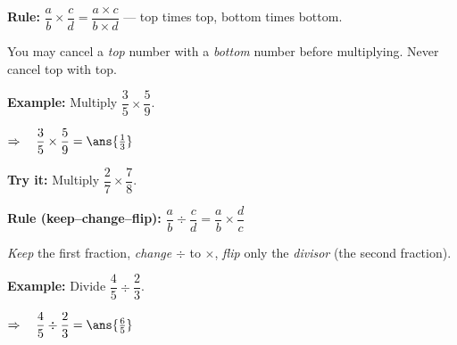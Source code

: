 \documentclass[12pt]{article}
\begin{document}


\begin{formulabox}
\textbf{Rule:} \quad
$\dfrac{a}{b} \times \dfrac{c}{d} = \dfrac{a \times c}{b \times d}$
\quad --- top times top, bottom times bottom.\par
You may cancel a \emph{top} number with a \emph{bottom} number before
multiplying. Never cancel top with top.
\end{formulabox}

\begin{examplebox}
\textbf{Example:} \quad Multiply $\dfrac{3}{5} \times \dfrac{5}{9}$.

$\Rightarrow\quad \dfrac{3}{5} \times \dfrac{5}{9} = \ans{\tfrac{1}{3}}$
\end{examplebox}

\begin{tryitbox}
\textbf{Try it:} \quad Multiply $\dfrac{2}{7} \times \dfrac{7}{8}$.\\[2pt]
\end{tryitbox}


\begin{formulabox}
\textbf{Rule (keep--change--flip):} \quad
$\dfrac{a}{b} \div \dfrac{c}{d} = \dfrac{a}{b} \times \dfrac{d}{c}$\par
\emph{Keep} the first fraction, \emph{change} $\div$ to $\times$, \emph{flip}
only the \emph{divisor} (the second fraction).
\end{formulabox}

\begin{examplebox}
\textbf{Example:} \quad Divide $\dfrac{4}{5} \div \dfrac{2}{3}$.

$\Rightarrow\quad \dfrac{4}{5} \div \dfrac{2}{3} = \ans{\tfrac{6}{5}}$
\end{examplebox}
\end{document}
